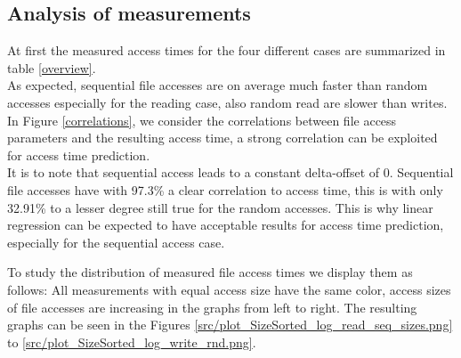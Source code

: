 \documentclass{superfri}
\begin{document}
\subsection{Analysis of measurements}
\label{sec:measurements}
At first the measured access times for the four different cases are summarized in table \ref{overview}.
\\
As expected, sequential file accesses are on average much faster than random accesses especially for the reading case, also random read are slower than writes.\\
In Figure \ref{correlations}, we consider the correlations between file access parameters and the resulting access time, a strong correlation can be exploited for access time prediction.
\\
It is to note that sequential access leads to a constant delta-offset of $0$.
Sequential file accesses have with 97.3\% a clear correlation to access time, this is with only 32.91\% to a lesser degree still true for the random accesses.
This is why linear regression can be expected to have acceptable results for access time prediction, especially for the sequential access case.\medskip

To study the distribution of measured file access times we display them as follows:
All measurements with equal access size have the same color, access sizes of file accesses are increasing in the graphs from left to right.
The resulting graphs can be seen in the Figures \ref{src/plot_SizeSorted_log_read_seq_sizes.png} to \ref{src/plot_SizeSorted_log_write_rnd.png}.
\end{document}
